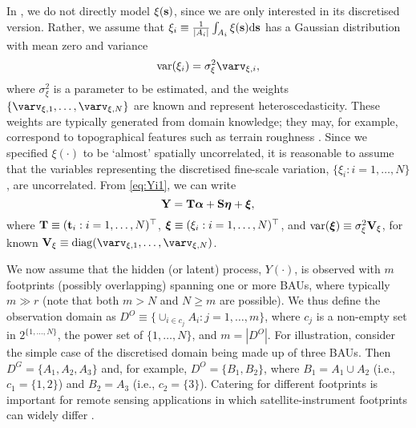 In , we do not directly model $\xi(\textbf{s})$, since we are only interested in its discretised version. Rather, we assume that $\xi_i \equiv \frac{1}{|A_i|}\int_{A_i} \xi(\textbf{s})\textrm{d}\textbf{s}$ has a Gaussian distribution with mean zero and variance
\begin{equation*}
\var(\xi_i) = \sigma^2_\xi \varv_{\xi,i},
\end{equation*}
where $\sigma^2_\xi$ is a parameter to be estimated, and the weights $\{\varv_{\xi,1},\dots,\varv_{\xi,N}\}$ are known and represent heteroscedasticity. These weights are typically generated from domain knowledge; they may, for example, correspond to topographical features such as terrain roughness \citep{Zammit_2015}. Since we specified $\xi(\cdot)$ to be `almost' spatially uncorrelated, it is reasonable to assume that the variables representing the discretised fine-scale variation, $\{\xi_i: i = 1,\dots,N\}$, are uncorrelated. From \eqref{eq:Yi1}, we can write
\begin{equation}\label{eq:SRE_Y}
\mathbf{Y} = \textbf{T}{\boldsymbol{\alpha}} + \textbf{S}\boldsymbol{\eta} + {\boldsymbol{\xi}},
\end{equation}
where $\textbf{T} \equiv (\textbf{t}_i: i = 1,\dots,N)^\top$, ${\boldsymbol{\xi}} \equiv (\xi_i : i = 1,\dots,N)^\top$, and $\mathrm{var}({\boldsymbol{\xi}}) \equiv \sigma^2_\xi \textbf{V}_\xi$, for known $\Vmat_\xi \equiv \diag(\varv_{\xi,1},\dots,\varv_{\xi,N})$.

We now  assume that the hidden (or latent) process, $Y(\cdot)$, is observed with $m$ footprints (possibly overlapping) spanning one or more BAUs, where typically $m \gg r$ (note that both $m > N$ and $N \ge m$ are possible). We thus define the observation domain as $D^O \equiv \{ \cup_{i \in c_j} A_i : j = 1,\dots,m \}$, where $c_j$ is a non-empty set in $2^{\{1,\dots,N\}}$, the power set of $\{1,\dots,N\}$, and $m = |D^O|$.  For illustration, consider the simple case of  the discretised domain being made up of three BAUs. Then $D^G = \{A_1,A_2,A_3\}$ and, for example, $D^O = \{B_1, B_2\}$, where $B_1 = A_1 \cup A_2$ (i.e., $c_1 = \{1,2\}$) and $B_2 = A_3$ (i.e., $c_2 = \{3\}$). Catering for different footprints is important for remote sensing applications in which satellite-instrument footprints can widely differ \citep[e.g.,][]{Zammit_2015}.

